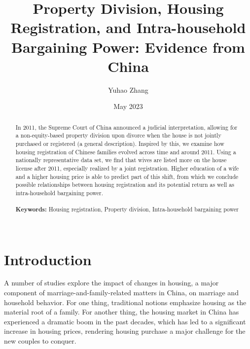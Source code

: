 \documentclass[11pt]{article}
\begin{document}
\begin{titlepage}
\title{\textbf{Property Division, Housing Registration, and Intra-household Bargaining Power: Evidence from China}}
\author{Yuhao Zhang}
\date{May 2023}
\maketitle
\begin{abstract}
\noindent In 2011, the Supreme Court of China announced a judicial interpretation, allowing for a non-equity-based property division upon divorce when the house is not jointly purchased or registered (a general description). Inspired by this, we examine how housing registration of Chinese families evolved across time and around 2011. Using a nationally representative data set, we find that wives are listed more on the house license after 2011, especially realized by a joint registration. Higher education of a wife and a higher housing price is able to predict part of this shift, from which we conclude possible relationships between housing registration and its potential return as well as intra-household bargaining power.\\
\vspace{0in}\\
\noindent\textbf{Keywords:} Housing registration, Property division, Intra-household bargaining power\\
\vspace{0in}\\

\bigskip
\end{abstract}
\setcounter{page}{0}
\thispagestyle{empty}
\end{titlepage}
\pagebreak \newpage


\section{Introduction} \label{sec:intro}
A number of studies explore the impact of changes in housing, a major component of marriage-and-family-related matters in China, on marriage and household behavior. For one thing, traditional notions emphasize housing as the material root of a family. For another thing, the housing market in China has experienced a dramatic boom in the past decades, which has led to a significant increase in housing prices, rendering housing purchase a major challenge for the new couples to conquer.
\end{document}

